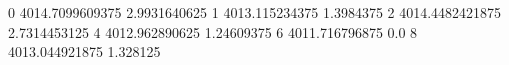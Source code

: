 0 4014.7099609375 2.9931640625
1 4013.115234375 1.3984375
2 4014.4482421875 2.7314453125
4 4012.962890625 1.24609375
6 4011.716796875 0.0
8 4013.044921875 1.328125
